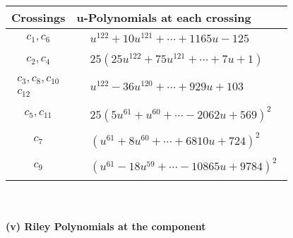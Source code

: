 \documentclass[1p]{elsarticle_modified}
\theoremstyle{definition}
\begin{document}
\begin{tabular}{m{50pt}|m{274pt}}
Crossings & \hspace{64pt}u-Polynomials at each crossing \\
\hline $$\begin{aligned}c_{1},c_{6}\end{aligned}$$&$\begin{aligned}
&u^{122}+10 u^{121}+\cdots+1165 u-125
\end{aligned}$\\
\hline $$\begin{aligned}c_{2},c_{4}\end{aligned}$$&$\begin{aligned}
&25(25 u^{122}+75 u^{121}+\cdots+7 u+1)
\end{aligned}$\\
\hline $$\begin{aligned}c_{3},c_{8},c_{10}\\c_{12}\end{aligned}$$&$\begin{aligned}
&u^{122}-36 u^{120}+\cdots+929 u+103
\end{aligned}$\\
\hline $$\begin{aligned}c_{5},c_{11}\end{aligned}$$&$\begin{aligned}
&25(5 u^{61}+u^{60}+\cdots-2062 u+569)^{2}
\end{aligned}$\\
\hline $$\begin{aligned}c_{7}\end{aligned}$$&$\begin{aligned}
&(u^{61}+8 u^{60}+\cdots+6810 u+724)^{2}
\end{aligned}$\\
\hline $$\begin{aligned}c_{9}\end{aligned}$$&$\begin{aligned}
&(u^{61}-18 u^{59}+\cdots-10865 u+9784)^{2}
\end{aligned}$\\
\hline
\end{tabular}\\~\\
\newpage\renewcommand{\arraystretch}{1}
\flushleft \textbf{(v) Riley Polynomials at the component}\newline \\
\end{document}
